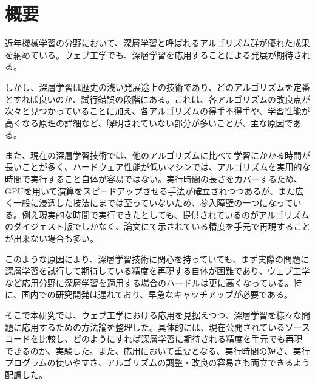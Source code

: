 \chapter*{概要}
近年機械学習の分野において、深層学習と呼ばれるアルゴリズム群が優れた成果を納めている。ウェブ工学でも、深層学習を応用することによる発展が期待される。\par
しかし、深層学習は歴史の浅い発展途上の技術であり、どのアルゴリズムを定番とすれば良いのか、試行錯誤の段階にある。これは、各アルゴリズムの改良点が次々と見つかっていることに加え、各アルゴリズムの得手不得手や、学習性能が高くなる原理の詳細など、解明されていない部分が多いことが、主な原因である。\par
また、現在の深層学習技術では、他のアルゴリズムに比べて学習にかかる時間が長いことが多く、ハードウェア性能が低いマシンでは、アルゴリズムを実用的な時間で実行すること自体が容易ではない。実行時間の長さをカバーするため、GPUを用いて演算をスピードアップさせる手法が確立されつつあるが、まだ広く一般に浸透した技法にまでは至っていないため、参入障壁の一つになっている。例え現実的な時間で実行できたとしても、提供されているのがアルゴリズムのダイジェスト版でしかなく、論文にて示されている精度を手元で再現することが出来ない場合も多い。\par
このような原因により、深層学習技術に関心を持っていても、まず実際の問題に深層学習を試行して期待している精度を再現する自体が困難であり、ウェブ工学など応用分野に深層学習を適用する場合のハードルは更に高くなっている。特に、国内での研究開発は遅れており、早急なキャッチアップが必要である。\par
そこで本研究では、ウェブ工学における応用を見据えつつ、深層学習を様々な問題に応用するための方法論を整理した。具体的には、現在公開されているソースコードを比較し、どのようにすれば深層学習に期待される精度を手元でも再現できるのか、実験した。また、応用において重要となる、実行時間の短さ、実行プログラムの使いやすさ、アルゴリズムの調整・改良の容易さも両立できるよう配慮した。

\begin{comment}このような原因により、深層学習技術に関心を持っていても、まず実際の問題に深層学習を試行すること自体が困難であり、応用技術開発のハードルは更に高くなっている。アルゴリズムが開発途上で確定できていないため、公開されているライブラリも、現状では、開発用途や実験的なものが多くなってしまっている。そもそも有力なアルゴリズムに対応する実装が用意されていない場合や、問題に応じて自らアルゴリズムの細部を調整しなければならない場合もある。ライブラリがGPU専用に書かれていることが徒となり、GPUを持っていないと実行自体ができなくなることも考えられる。例え実行するところまで到達できたとしても、提供されているのがアルゴリズムのダイジェスト版でしかなく、論文にて示されている精度を手元で再現することが出来ない場合も多い。標準と言える公開ライブラリが確立していない状況なので、ウェブ工学など応用分野に深層学習を適用したいと考えても、プログラム開発に長い時間がかかってしまい、開発における大きな障壁となっている。特に、国内での研究開発は遅れており、早急なキャッチアップが必要である。
\end{comment}
